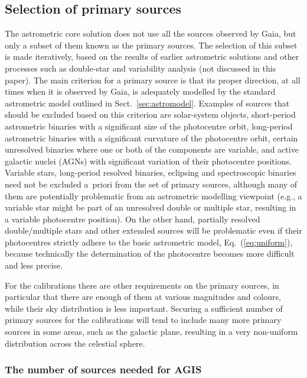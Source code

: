 \documentclass[structabstract]{aa}
\begin{document}
\subsection{Selection of primary sources} \label{sec:primsel}

The astrometric core solution does not use all the sources observed by Gaia, 
but only a subset of them known as the primary sources. The selection of
this subset is made iteratively, based on the results of earlier astrometric
solutions and other processes such as double-star and variability analysis
(not discussed in this paper). The main criterion for a primary source is that
its proper direction, at all times when it is observed by Gaia, is adequately
modelled by the standard astrometric model outlined in 
Sect.~\ref{sec:astromodel}. Examples of sources that should be excluded
based on this criterion are solar-system objects, short-period astrometric 
binaries with a significant size of the photocentre orbit, long-period 
astrometric binaries with a significant curvature of the photocentre orbit, 
certain unresolved binaries where one or both of the components are variable, 
and active galactic nuclei (AGNs) with significant variation of their 
photocentre positions. Variable stars, long-period resolved binaries, 
eclipsing and spectroscopic binaries need not be excluded a~priori from
the set of primary sources, although many of them are potentially problematic
from an astrometric modelling viewpoint (e.g., a variable star might be part of an
unresolved double or multiple star, resulting in a variable photocentre position).
On the other hand, partially resolved double/multiple stars and other 
extended sources will be problematic
even if their photocentres strictly adhere to the basic astrometric model, 
Eq.~(\ref{eq:uniform}), because technically the determination of the 
photocentre becomes more difficult and less precise.


For the calibrations there are other requirements on the primary sources, in
particular that there are enough of them at various magnitudes and colours,
while their sky distribution is less important. Securing a sufficient number of
primary sources for the calibrations will tend to include many more 
primary sources in some areas, such as the galactic plane, resulting in a 
very non-uniform distribution across the celestial sphere.


\subsubsection{The number of sources needed for AGIS} \label{sec:numsources}
\end{document}
